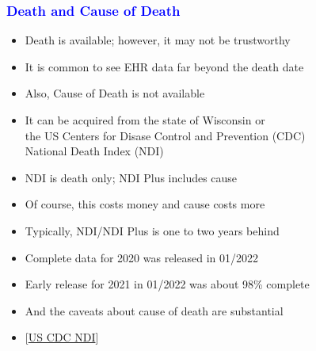 \documentclass[11pt,pdftex,dvipsnames,usenames]{beamer}
\begin{document}
\begin{frame}[fragile]\frametitle{\bf\textcolor{blue}{Death and Cause
      of Death}}

\begin{itemize}
\item Death is available; however, it may not be trustworthy
\item It is common to see EHR data far beyond the death date
\item Also, Cause of Death is not available
\item It can be acquired from the state of Wisconsin or\\
the US Centers for Disase Control and Prevention (CDC) \\ 
National Death Index (NDI)
\item NDI is death only; NDI Plus includes cause %
\item Of course, this costs money and cause costs more
\item Typically, NDI/NDI Plus is one to two years behind
\item Complete data for 2020 was released in 01/2022
\item Early release for 2021 in 01/2022 was about 98\% complete 
\item And the caveats about cause of death are substantial
\item \textcolor{PineGreen}{[\href{https://www.cdc.gov/nchs/ndi/index.htm}
{US CDC NDI}]}
\end{itemize}

\end{frame}
\end{document}
